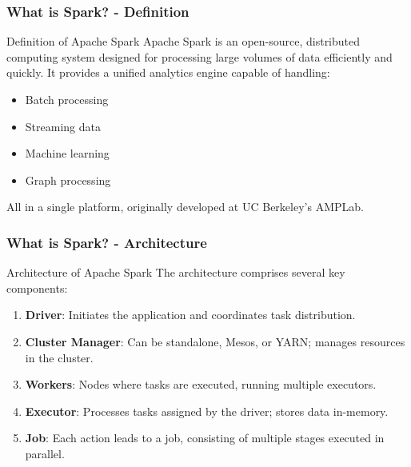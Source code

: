 \documentclass[aspectratio=169]{beamer}
\begin{document}
\begin{frame}[fragile]
    \frametitle{What is Spark? - Definition}
    \begin{block}{Definition of Apache Spark}
        Apache Spark is an open-source, distributed computing system designed for processing large volumes of data efficiently and quickly. It provides a unified analytics engine capable of handling:
        \begin{itemize}
            \item Batch processing
            \item Streaming data
            \item Machine learning
            \item Graph processing
        \end{itemize}
        All in a single platform, originally developed at UC Berkeley's AMPLab.
    \end{block}
\end{frame}

\begin{frame}[fragile]
    \frametitle{What is Spark? - Architecture}
    \begin{block}{Architecture of Apache Spark}
        The architecture comprises several key components:
        \begin{enumerate}
            \item \textbf{Driver}: Initiates the application and coordinates task distribution.
            \item \textbf{Cluster Manager}: Can be standalone, Mesos, or YARN; manages resources in the cluster.
            \item \textbf{Workers}: Nodes where tasks are executed, running multiple executors.
            \item \textbf{Executor}: Processes tasks assigned by the driver; stores data in-memory.
            \item \textbf{Job}: Each action leads to a job, consisting of multiple stages executed in parallel.
        \end{enumerate}
    \end{block}
\end{frame}
\end{document}
